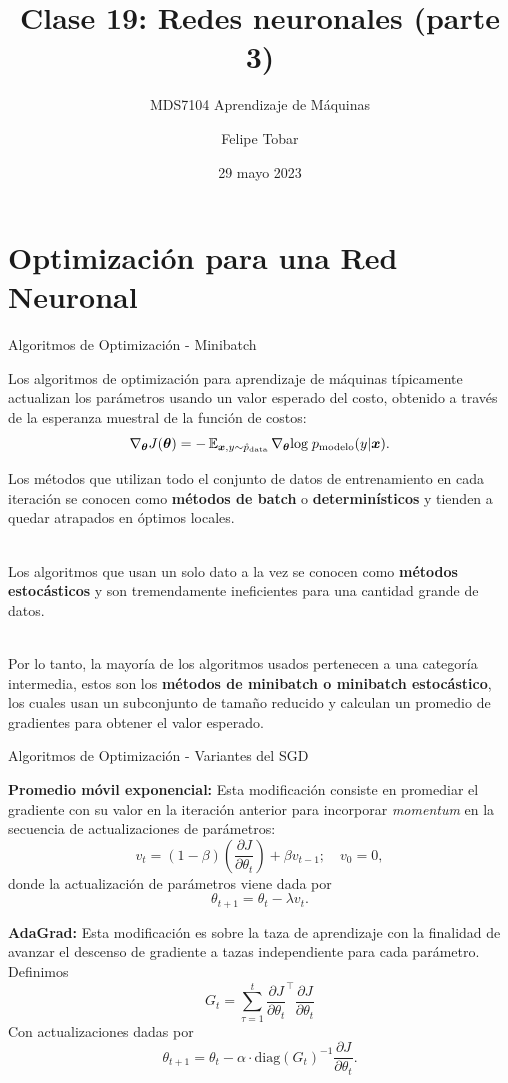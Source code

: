 \documentclass[handout, 9pt]{beamer}
\title{Clase 19: Redes neuronales (parte 3)}
\subtitle{MDS7104 Aprendizaje de Máquinas}
\date{29 mayo 2023}
\author{Felipe Tobar}
\institute{Iniciativa de Datos e Inteligencia Artificial\\Universidad de Chile}
\begin{document}
\begin{frame}
  \titlepage
\end{frame}

\section{Optimización para una Red Neuronal}
\begin{frame}{Algoritmos de Optimización - Minibatch}

Los algoritmos de optimización para aprendizaje de máquinas típicamente actualizan los parámetros usando un valor esperado del costo, obtenido a través de la esperanza muestral de la función de costos: \pause
\begin{equation*}
\nabla_{\bm{\theta}}J(\bm{\theta}) = -\operatorname{\mathbb{E}}_{\bm{x},y\sim \hat{p}_{\textrm{data}}}\nabla_{\bm{\theta}}\textrm{log}\; p_{\textrm{modelo}}(y|\bm{x}).
\end{equation*} \pause

Los métodos que utilizan todo el conjunto de datos de entrenamiento en cada iteración se conocen como \textbf{métodos de batch} o \textbf{determinísticos} y tienden a quedar atrapados en óptimos locales. \\~\ \pause 

Los algoritmos que usan un solo dato a la vez se conocen como \textbf{métodos estocásticos} y son tremendamente ineficientes para una cantidad grande de datos. \\~\ 

Por lo tanto, la mayoría de los algoritmos usados pertenecen a una categoría intermedia, estos son los \textbf{métodos de minibatch o minibatch estocástico}, los cuales usan un subconjunto de tamaño reducido y calculan un promedio de gradientes para obtener el valor esperado.


\end{frame}

\begin{frame}{Algoritmos de Optimización - Variantes del SGD}

\textbf{Promedio móvil exponencial:} Esta modificación consiste en promediar el gradiente con su valor en la iteración anterior para incorporar \emph{momentum} en la secuencia de actualizaciones de parámetros: \pause
\[
v_t = (1-\beta) \left ( \frac{\partial J}{\partial \theta_t} \right ) + \beta v_{t-1};  \quad v_0 = 0,
\] \pause
donde la actualización de parámetros viene dada por 
\[
\theta_{t+1} = \theta_t - \lambda v_t.
\] \pause 

\textbf{AdaGrad:} Esta modificación es sobre la taza de aprendizaje con la finalidad de avanzar el descenso de gradiente a tazas independiente para cada parámetro. Definimos \pause
\[
G_{t} = \sum_{\tau=1}^t \frac{\partial J}{\partial \theta_t}^\top \frac{\partial J}{\partial \theta_t}
\] 
Con actualizaciones dadas por \pause
\[
\theta_ {t+1} = \theta_t - \alpha\cdot\text{diag}\left({G_t}\right)^{-1} \frac{\partial J}{\partial \theta_t}.
\]


\end{frame}
\end{document}
